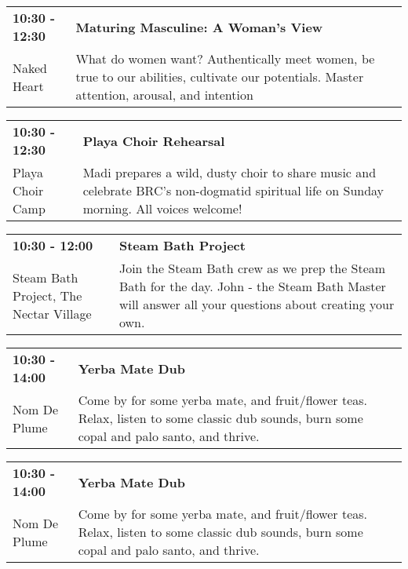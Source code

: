 \begin{tabular}{ p{1in} p{2.2in} }
    \textbf{10:30 - 12:30} & \textbf{Maturing Masculine: A Woman's View} \\
    Naked Heart \newline  & What do women want? Authentically meet women, be true to our abilities, cultivate our potentials. Master attention, arousal, and intention \\
    \hline 
\end{tabular}
    
\begin{tabular}{ p{1in} p{2.2in} }
    \textbf{10:30 - 12:30} & \textbf{Playa Choir Rehearsal} \\
    Playa Choir Camp \newline  & Madi prepares a wild, dusty choir to share music and celebrate BRC's non-dogmatid spiritual life on Sunday morning. All voices welcome! \\
    \hline 
\end{tabular}
    
\begin{tabular}{ p{1in} p{2.2in} }
    \textbf{10:30 - 12:00} & \textbf{Steam Bath Project} \\
    Steam Bath Project, The \newline Nectar Village & Join the Steam Bath crew as we prep the Steam Bath for the day. John - the Steam Bath Master will answer all your questions about creating your own. \\
    \hline 
\end{tabular}
    
\begin{tabular}{ p{1in} p{2.2in} }
    \textbf{10:30 - 14:00} & \textbf{Yerba Mate Dub} \\
    Nom De Plume \newline  & Come by for some yerba mate, and fruit/flower teas. Relax, listen to some classic dub sounds, burn some copal and palo santo, and thrive. \\
    \hline 
\end{tabular}
    
\begin{tabular}{ p{1in} p{2.2in} }
    \textbf{10:30 - 14:00} & \textbf{Yerba Mate Dub} \\
    Nom De Plume \newline  & Come by for some yerba mate, and fruit/flower teas. Relax, listen to some classic dub sounds, burn some copal and palo santo, and thrive. \\
    \hline 
\end{tabular}
    
